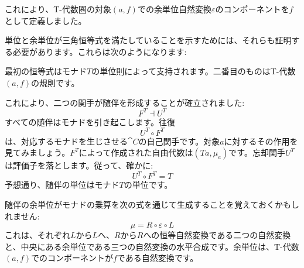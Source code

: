 \begin{figure}[H]
  \centering
\end{figure}

\noindent
これにより、T-代数圏の対象$(a, f)$での余単位自然変換$\varepsilon$のコンポーネントを$f$として定義しました。

単位と余単位が三角恒等式を満たしていることを示すためには、それらも証明する必要があります。これらは次のようになります: 

\begin{figure}[H]
  \centering
  \begin{subfigure}
    \centering
  \end{subfigure}%
  \hspace{1cm}
  \begin{subfigure}
    \centering
  \end{subfigure}
\end{figure}

\noindent
最初の恒等式はモナド$T$の単位則によって支持されます。二番目のものはT-代数$(a, f)$の規則です。

これにより、二つの関手が随伴を形成することが確立されました: 
\[F^T \dashv U^T\]
すべての随伴はモナドを引き起こします。往復
\[U^T \circ F^T\]
は、対応するモナドを生じさせる$\cat{C}$の自己関手です。対象$a$に対するその作用を見てみましょう。$F^T$によって作成された自由代数は$(T a, \mu_a)$です。忘却関手$U^T$は評価子を落とします。従って、確かに: 
\[U^T \circ F^T = T\]
予想通り、随伴の単位はモナド$T$の単位です。

随伴の余単位がモナドの乗算を次の式を通じて生成することを覚えておくかもしれません: 
\[\mu = R \circ \varepsilon \circ L\]
これは、それぞれ$L$から$L$へ、$R$から$R$への恒等自然変換である二つの自然変換と、中央にある余単位である三つの自然変換の水平合成です。余単位は、T-代数$(a, f)$でのコンポーネントが$f$である自然変換です。

